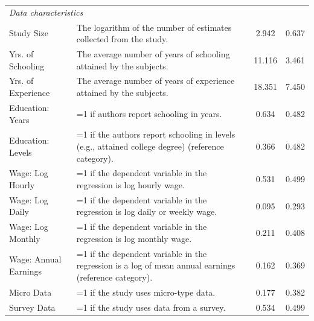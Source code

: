 \begin{singlespace}
\begin{scriptsize}
\begin{longtable}{
@{\hskip\tabcolsep\extracolsep\fill}
l
p{0.55\hsize}
cc
@{}
}
\multicolumn{4}{l}{\emph{Data characteristics}}\\	
             Study Size &                                                                                       The logarithm of the number of estimates collected from the study. &    2.942 &  0.637 \\
      Yrs. of Schooling &                                                                                       The average number of years of schooling attained by the subjects. &   11.116 &  3.461 \\
     Yrs. of Experience &                                                                                      The average number of years of experience attained by the subjects. &   18.351 &  7.450 \\
       Education: Years &                                                                                                                 =1 if authors report schooling in years. &    0.634 &  0.482 \\
      Education: Levels &                                                       =1 if the authors report schooling in levels (e.g., attained college degree) (reference category). &    0.366 &  0.482 \\
       Wage: Log Hourly &                                                                                       =1 if the dependent variable in the regression is log hourly wage. &    0.531 &  0.499 \\
        Wage: Log Daily &                                                                              =1 if the dependent variable in the regression is log daily or weekly wage. &    0.095 &  0.293 \\
      Wage: Log Monthly &                                                                                      =1 if the dependent variable in the regression is log monthly wage. &    0.211 &  0.408 \\
  Wage: Annual Earnings &                                                      =1 if the dependent variable in the regression is a log of mean annual earnings (reference category). &    0.162 &  0.369 \\
             Micro Data &                                                                                                                         =1 if the study uses micro-type data. &    0.177 &  0.382 \\
            Survey Data &                                                                                                                 =1 if the study uses data from a survey. &    0.534 &  0.499 \\

\end{longtable}
\end{scriptsize}
\end{singlespace}
